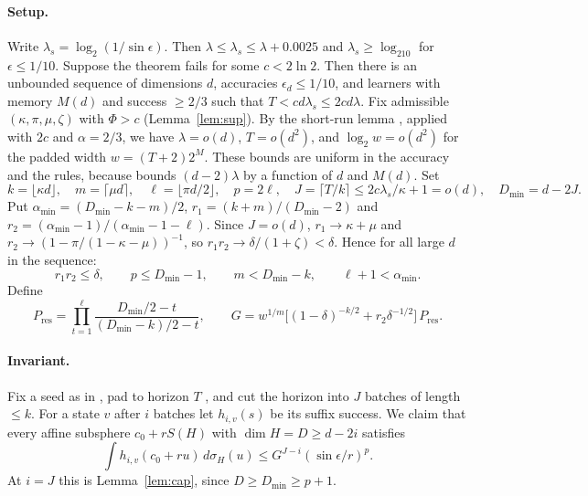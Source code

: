 \documentclass[11pt]{article}
\theoremstyle{definition}
\theoremstyle{remark}
\newcommand{\Ores}{P_{\mathrm{res}}}
\begin{document}
\paragraph{Setup.} Write \(\lambda_s=\log_2(1/\sin\epsilon)\). Then \(\lambda\le\lambda_s\le\lambda+0.0025\) and
\(\lambda_s\ge\log_210\) for \(\epsilon\le1/10\).
Suppose the theorem fails for some \(c<2\ln2\). Then there is an unbounded
sequence of dimensions \(d\), accuracies \(\epsilon_d\le1/10\), and learners with memory \(M(d)\) and success \(\ge2/3\) such that
\(T<cd\lambda_s\le2cd\lambda\). Fix admissible \((\kappa,\pi,\mu,\zeta)\) with \(\Phi>c\) (Lemma~\ref{lem:sup}). By the
short-run lemma \cite[Lemma~4.2]{OAIsub}, applied with \(2c\) and \(\alpha=2/3\), we have
\(\lambda=o(d)\), \(T=o(d^2)\), and \(\log_2 w=o(d^2)\) for the padded width \(w=(T+2)2^M\). These bounds
are uniform in the accuracy and the rules, because \cite[eq.~(18)]{OAIsub} bounds \((d-2)\lambda\) by a
function of \(d\) and \(M(d)\). Set
\[
 k=\lfloor\kappa d\rfloor,\quad m=\lceil\mu d\rceil,\quad \ell=\lfloor\pi d/2\rfloor,\quad p=2\ell,\quad
 J=\lceil T/k\rceil\le 2c\lambda_s/\kappa+1=o(d),\quad D_{\min}=d-2J .
\]
Put \(\alpha_{\min}=(D_{\min}-k-m)/2\), \(r_1=(k+m)/(D_{\min}-2)\) and \(r_2=(\alpha_{\min}-1)/(\alpha_{\min}-1-\ell)\).
Since \(J=o(d)\), \(r_1\to\kappa+\mu\) and \(r_2\to(1-\pi/(1-\kappa-\mu))^{-1}\), so \(r_1r_2\to\delta/(1+\zeta)<\delta\).
Hence for all large \(d\) in the sequence:
\begin{equation}\label{eq:eventual}
 r_1r_2\le\delta,\qquad p\le D_{\min}-1,\qquad m<D_{\min}-k,\qquad \ell+1<\alpha_{\min}.
\end{equation}
Define
\[
 \Ores=\prod_{t=1}^{\ell}\frac{D_{\min}/2-t}{(D_{\min}-k)/2-t},\qquad
 G=w^{1/m}\bigl[(1-\delta)^{-k/2}+r_2\delta^{-1/2}\bigr]\,\Ores .
\]

\paragraph{Invariant.} Fix a seed as in \cite[Lemma~2.1]{OAIsub}, pad to horizon \(T\)
\cite[Lemma~4.1]{OAIsub}, and cut the horizon into \(J\) batches of length \(\le k\). For a state \(v\) after \(i\)
batches let \(h_{i,v}(s)\) be its suffix success. We claim that every affine subsphere \(c_0+rS(H)\) with
\(\dim H=D\ge d-2i\) satisfies
\begin{equation}\label{eq:inv}
 \int h_{i,v}(c_0+ru)\,d\sigma_H(u)\le G^{J-i}(\sin\epsilon/r)^p .
\end{equation}
At \(i=J\) this is Lemma~\ref{lem:cap}, since \(D\ge D_{\min}\ge p+1\).
\end{document}
